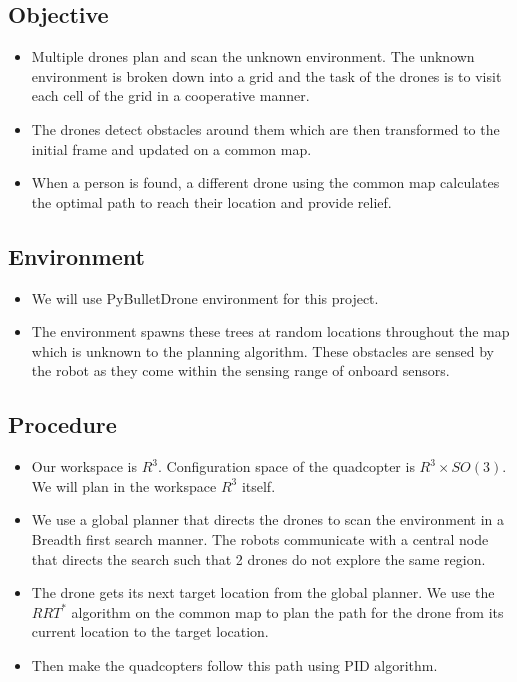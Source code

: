 \subsection{Objective}
\begin{itemize}
    \item Multiple drones plan and scan the unknown environment. The unknown environment is broken down into a grid and the task of the drones is to visit each cell of the grid in a cooperative manner.
    \item The drones detect obstacles around them which are then transformed to the initial frame and updated on a common map.
    \item When a person is found, a different drone using the common map calculates the optimal path to reach their location and provide relief.
\end{itemize}

\subsection{Environment}
\begin{itemize}
    \item We will use PyBulletDrone environment for this project.
    \item The environment spawns these trees at random locations throughout the map which is unknown to the planning algorithm. These obstacles are sensed by the robot as they come within the sensing range of onboard sensors.
\end{itemize}

\subsection{Procedure}
\begin{itemize}
    \item Our workspace is \(R^3\). Configuration space of the quadcopter is \(R^3 \times SO(3)\). We will plan in the workspace \(R^3\) itself. 
    \item We use a global planner that directs the drones to scan the environment in a Breadth first search manner. The robots communicate with a central node that directs the search such that 2 drones do not explore the same region.
    \item The drone gets its next target location from the global planner. We use the \(RRT^*\) algorithm on the common map to plan the path for the drone from its current location to the target location.
    \item Then make the quadcopters follow this path using PID algorithm.
\end{itemize}

